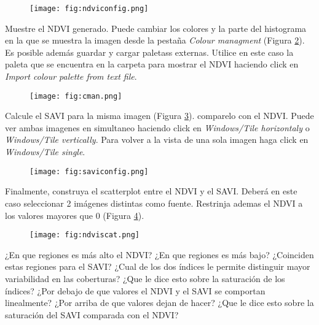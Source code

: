 \begin{figure}[h!]
    \centering
    \texttt{[image: fig:ndviconfig.png]}
    \caption{}
    \label{fig:ndviconfig}
\end{figure}

Muestre el NDVI generado. Puede cambiar los colores y la parte del histograma en la que se muestra la imagen desde la pestaña \emph{Colour managment} (Figura \ref{fig:cman}). Es posible además guardar y cargar paletass externas. Utilice en este caso la paleta  que se encuentra en la carpeta  para mostrar el NDVI haciendo click en \emph{Import colour palette from text file}.

\begin{figure}[h!]
    \centering
    \texttt{[image: fig:cman.png]}
    \caption{}
    \label{fig:cman}
\end{figure}

Calcule el SAVI para la misma imagen (Figura \ref{fig:saviconfig}). comparelo con el NDVI. Puede ver ambas imagenes en simultaneo haciendo click en \emph{Windows/Tile horizontaly} o \emph{Windows/Tile vertically}. Para volver a la vista de una sola imagen haga click en \emph{Windows/Tile single}.


\begin{figure}[h!]
    \centering
    \texttt{[image: fig:saviconfig.png]}
    \caption{}
    \label{fig:saviconfig}
\end{figure}

Finalmente, construya el scatterplot entre el NDVI y el SAVI. Deberá en este caso seleccionar 2 imágenes distintas como fuente. Restrinja ademas el NDVI a los valores mayores que 0 (Figura \ref{fig:ndviscat}).

\begin{figure}[h!]
    \centering
    \texttt{[image: fig:ndviscat.png]}
    \caption{}
    \label{fig:ndviscat}
\end{figure}

\begin{que}
    ¿En que regiones es más alto el NDVI? ¿En que regiones es más bajo? ¿Coinciden estas regiones para el SAVI? ¿Cual de los dos índices le permite distinguir mayor variabilidad en las coberturas? ¿Que le dice esto sobre la saturación de los índices? ¿Por debajo de que valores el NDVI y el SAVI se comportan linealmente? ¿Por arriba de que valores dejan de hacer? ¿Que le dice esto sobre la saturación del SAVI comparada con el NDVI?
\end{que}

